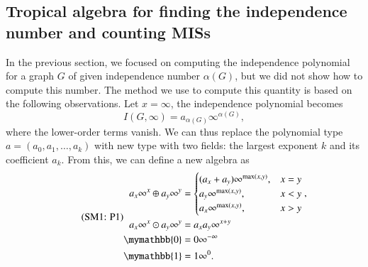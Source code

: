 \documentclass[onefignum, onetabnum]{siamart190516}
\newcommand{\eqname}[1]{\stepcounter{equation}\tag{\theequation : #1}}
\newcommand{\<}{\langle}
\renewcommand{\>}{\rangle}
\begin{document}
\subsection{Tropical algebra for finding the independence number and counting MISs}
In the previous section, we focused on computing the independence polynomial for a graph $G$ of given independence number $\alpha(G)$, but we did not show how to compute this number.
The method we use to compute this quantity is based on the following observations. Let $x=\infty$, the independence polynomial becomes
\begin{equation}
I(G, \infty) = a_{\alpha(G)} \infty^{\alpha(G)},
\end{equation}
where the lower-order terms vanish. We can thus replace the polynomial type $a = (a_0, a_1, \ldots, a_k)$ with new type with two fields: the largest exponent $k$ and its coefficient $a_k$.
From this, we can define a new algebra as
\begin{equation}
    \eqname{P1}
\begin{split}
    a_x\infty^x \oplus a_y\infty^y &= \begin{cases}
        (a_x + a_y)\infty^{\max(x,y)}, & x = y\\
        a_y\infty^{\max(x,y)}, & x < y\\
        a_x\infty^{\max(x,y)}, & x > y
    \end{cases}, \\
    a_x\infty^x \odot a_y\infty^y &= a_x a_y\infty^{x+y}\\
    \mymathbb{0} &= 0\infty^{-\infty}\\
    \mymathbb{1} &= 1\infty^{0}.
\end{split}%
\label{eq:countingtropical}
\end{equation}
\end{document}
